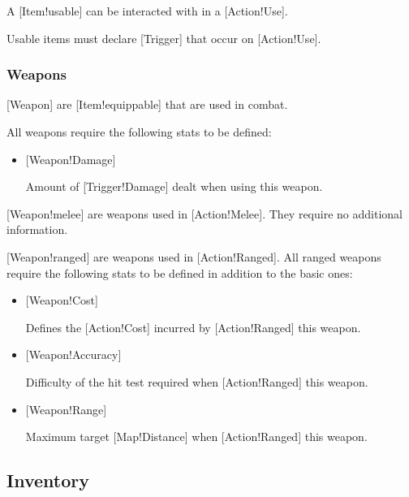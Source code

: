 A [Item!usable] can be interacted with in a [Action!Use].

Usable items must declare [Trigger] that occur on [Action!Use].

\subsubsection{Weapons}

[Weapon] are [Item!equippable] that are used in combat.

All weapons require the following stats to be defined:

\begin{itemize}
    \item {}[Weapon!Damage]

    Amount of [Trigger!Damage] dealt when using this weapon.
\end{itemize}

[Weapon!melee] are weapons used in [Action!Melee].
They require no additional information.

[Weapon!ranged] are weapons used in [Action!Ranged].
All ranged weapons require the following stats to be defined in addition to the basic ones:

\begin{itemize}
    \item {}[Weapon!Cost]

    Defines the [Action!Cost] incurred by [Action!Ranged] this weapon.

    \item {}[Weapon!Accuracy]

    Difficulty of the hit test required when [Action!Ranged] this weapon.

    \item {}[Weapon!Range]

    Maximum target [Map!Distance] when [Action!Ranged] this weapon.
\end{itemize}

\subsection{Inventory}

